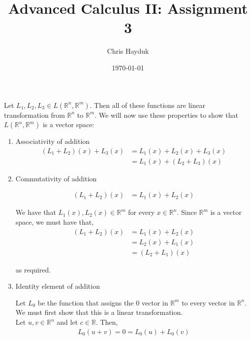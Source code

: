 \documentclass[12pt]{article}
\newenvironment{problem}[2][Problem]{\begin{trivlist}
\item[\hskip \labelsep {\bfseries #1}\hskip \labelsep {\bfseries #2.}]}{\end{trivlist}}
\begin{document}
\title{Advanced Calculus II: Assignment 3}

\author{Chris Hayduk}
\date{\today}

\maketitle

\begin{problem}{1}
\end{problem}

Let $L_1, L_2, L_3 \in L(\mathbb{R}^n, \mathbb{R}^m)$. Then all of these functions are linear transformation from $\mathbb{R}^n$ to $\mathbb{R}^m$. We will now use these properties to show that $L(\mathbb{R}^n, \mathbb{R}^m)$ is a vector space:

\begin{enumerate}

\item Associativity of addition
\begin{align*}
(L_1 + L_2)(x) + L_3(x) &= L_1(x) + L_2(x) + L_3(x)\\
&= L_1(x) + (L_2 + L_3)(x)
\end{align*}

\item Commutativity of addition

\begin{align*}
(L_1 + L_2)(x) &= L_1(x) + L_2(x)
\end{align*}

We have that $L_1(x), L_2(x) \in \mathbb{R}^m$ for every $x \in \mathbb{R}^n$. Since $\mathbb{R}^m$ is a vector space, we must have that,
\begin{align*}
(L_1 + L_2)(x) &= L_1(x) + L_2(x)\\
&= L_2(x) + L_1(x)\\
&= (L_2 + L_1)(x)
\end{align*}

as required.

\item Identity element of addition

Let $L_0$ be the function that assigns the $0$ vector in $\mathbb{R}^m$ to every vector in $\mathbb{R}^n$. We must first show that this is a linear transformation.\\

Let $u, v \in \mathbb{R}^n$ and let $c \in \mathbb{R}$. Then,
\begin{align*}
L_0(u + v) = 0 = L_0(u) + L_0(v)
\end{align*}


\end{enumerate}
\end{document}
